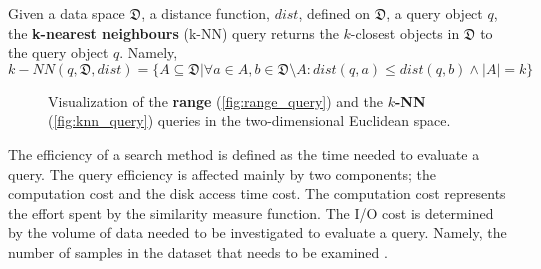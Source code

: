 \begin{definition}
Given a data space $\mathfrak{D}$, a distance function, $dist$, defined on $\mathfrak{D}$, a query object $q$, the \textbf{k-nearest neighbours} (k-NN) query returns the $k$-closest objects in $\mathfrak{D}$ to the query object $q$. Namely,
\begin{equation}
k-NN(q,\mathfrak{D},dist)=\{A \subseteq \mathfrak{D} | \forall a \in A, b \in \mathfrak{D} \setminus A: dist(q,a) \leq dist(q,b) \wedge |A|=k \}
\end{equation}
\label{def:knn_query} 
\end{definition}

\begin{figure}[h!]
	\centering
    \caption{Visualization of the \textbf{range} (\ref{fig:range_query}) and the \textbf{$k$-NN} (\ref{fig:knn_query}) queries in the two-dimensional Euclidean space.}
   \label{fig:similarity_query_types}
\end{figure}

\iftoggle{edit-mode}{\hspace{0pt}\marginpar{Problems - similarity search costs}}{}
The efficiency of a search method is defined as the time needed to evaluate a query. 
The query efficiency is affected mainly by two components; the computation cost and the disk access time cost. 
The computation cost represents the effort spent by the similarity measure function. 
The I/O cost is determined by the volume of data needed to be investigated to evaluate a query. Namely, the number of samples in the dataset that needs to be examined \cite{saabni2013efficient}.

